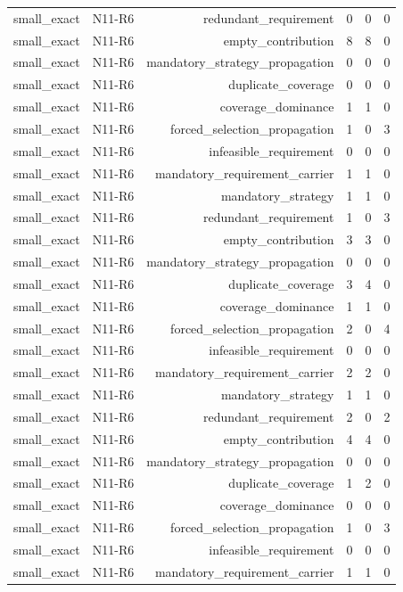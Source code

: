 {\begin{longtable}{lrrrrr}
small\_exact & N11-R6 & redundant\_requirement & 0 & 0 & 0 \\
small\_exact & N11-R6 & empty\_contribution & 8 & 8 & 0 \\
small\_exact & N11-R6 & mandatory\_strategy\_propagation & 0 & 0 & 0 \\
small\_exact & N11-R6 & duplicate\_coverage & 0 & 0 & 0 \\
small\_exact & N11-R6 & coverage\_dominance & 1 & 1 & 0 \\
small\_exact & N11-R6 & forced\_selection\_propagation & 1 & 0 & 3 \\
small\_exact & N11-R6 & infeasible\_requirement & 0 & 0 & 0 \\
small\_exact & N11-R6 & mandatory\_requirement\_carrier & 1 & 1 & 0 \\
small\_exact & N11-R6 & mandatory\_strategy & 1 & 1 & 0 \\
small\_exact & N11-R6 & redundant\_requirement & 1 & 0 & 3 \\
small\_exact & N11-R6 & empty\_contribution & 3 & 3 & 0 \\
small\_exact & N11-R6 & mandatory\_strategy\_propagation & 0 & 0 & 0 \\
small\_exact & N11-R6 & duplicate\_coverage & 3 & 4 & 0 \\
small\_exact & N11-R6 & coverage\_dominance & 1 & 1 & 0 \\
small\_exact & N11-R6 & forced\_selection\_propagation & 2 & 0 & 4 \\
small\_exact & N11-R6 & infeasible\_requirement & 0 & 0 & 0 \\
small\_exact & N11-R6 & mandatory\_requirement\_carrier & 2 & 2 & 0 \\
small\_exact & N11-R6 & mandatory\_strategy & 1 & 1 & 0 \\
small\_exact & N11-R6 & redundant\_requirement & 2 & 0 & 2 \\
small\_exact & N11-R6 & empty\_contribution & 4 & 4 & 0 \\
small\_exact & N11-R6 & mandatory\_strategy\_propagation & 0 & 0 & 0 \\
small\_exact & N11-R6 & duplicate\_coverage & 1 & 2 & 0 \\
small\_exact & N11-R6 & coverage\_dominance & 0 & 0 & 0 \\
small\_exact & N11-R6 & forced\_selection\_propagation & 1 & 0 & 3 \\
small\_exact & N11-R6 & infeasible\_requirement & 0 & 0 & 0 \\
small\_exact & N11-R6 & mandatory\_requirement\_carrier & 1 & 1 & 0 \\

\end{longtable}}
